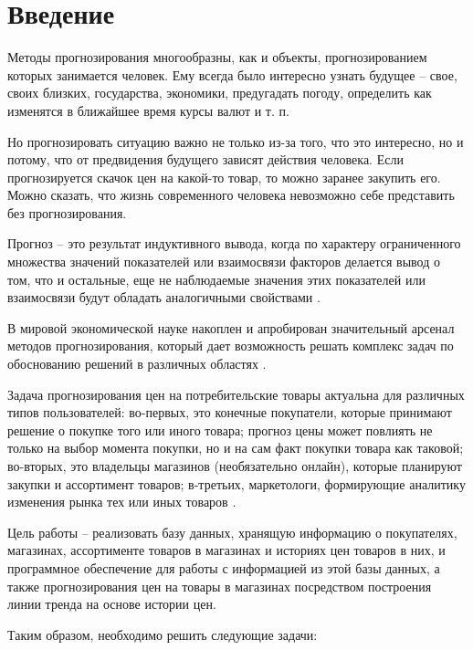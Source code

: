 \documentclass[a4paper,14pt]{extreport}
\begin{document}
	
\renewcommand{\contentsname}{Содержание}
\tableofcontents
\setcounter{page}{3}


\chapter*{Введение}

Методы прогнозирования многообразны, как и объекты, прогнозированием которых занимается человек. Ему всегда было интересно узнать будущее -- свое, своих близких, государства, экономики, предугадать погоду, определить как изменятся в ближайшее время курсы валют и т. п.

Но прогнозировать ситуацию важно не только из-за того, что это интересно, но и потому, что от предвидения будущего зависят действия человека. Если прогнозируется скачок цен на какой-то товар, то можно заранее закупить его. Можно сказать, что жизнь современного человека невозможно себе представить без прогнозирования.

Прогноз -- это результат индуктивного вывода, когда по характеру ограниченного множества значений показателей или взаимосвязи факторов делается вывод о том, что и остальные, еще не наблюдаемые значения этих показателей или взаимосвязи будут обладать аналогичными свойствами \cite{hse_pred}.

В мировой экономической науке накоплен и апробирован значительный арсенал методов прогнозирования, который дает возможность решать комплекс задач по обоснованию решений в различных областях \cite{bel_prog}.

Задача прогнозирования цен на потребительские товары актуальна для различных типов пользователей: во-первых, это конечные покупатели, которые принимают решение о покупке того или иного товара; прогноз цены может повлиять не только на выбор момента покупки, но и на сам факт покупки товара как таковой; во-вторых, это владельцы магазинов (необязательно онлайн), которые планируют закупки и ассортимент товаров; в-третьих, маркетологи, формирующие аналитику изменения рынка тех или иных товаров \cite{met_pred_online}.

Цель работы -- реализовать базу данных, хранящую информацию о покупателях, магазинах, ассортименте товаров в магазинах и историях цен товаров в них, и программное обеспечение для работы с информацией из этой базы данных, а также прогнозирования цен на товары в магазинах посредством построения линии тренда на основе истории цен.

Таким образом, необходимо решить следующие задачи:
\end{document}
